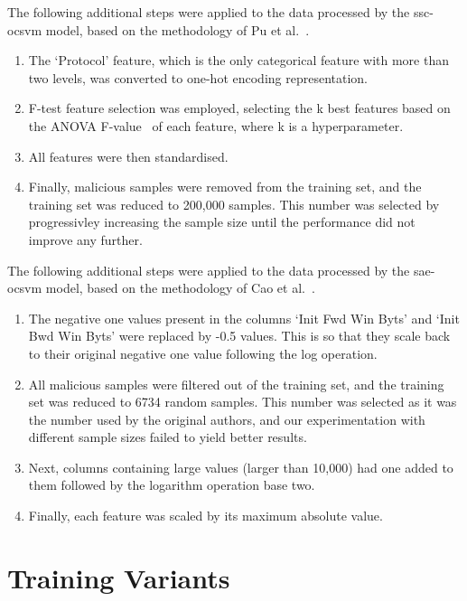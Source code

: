The following additional steps were applied to the data processed by the
\gls{ssc}-\gls{ocsvm} model, based on the methodology of Pu et al.~\cite{Cao}.
\begin{enumerate}
      \item The `Protocol' feature, which is the only categorical feature with more than
            two levels, was converted to one-hot encoding representation.
      \item F-test feature selection was employed, selecting the k best features based on
            the ANOVA F-value~\cite{f_test} of each feature, where k is a hyperparameter.
      \item All features were then standardised.
      \item Finally, malicious samples were removed from the training set, and the training
            set was reduced to 200,000 samples. This number was selected by progressivley
            increasing the sample size until the performance did not improve any further.
\end{enumerate}

The following additional steps were applied to the data processed by the
\gls{sae}-\gls{ocsvm} model, based on the methodology of Cao et al.~\cite{Cao}.
\begin{enumerate}
      \item The negative one values present in the columns `Init Fwd Win Byts' and `Init
            Bwd Win Byts' were replaced by -0.5 values. This is so that they scale back to
            their original negative one value following the log operation.
      \item All malicious samples were filtered out of the training set, and the training
            set was reduced to 6734 random samples. This number was selected as it was the
            number used by the original authors, and our experimentation with different
            sample sizes failed to yield better results.
      \item Next, columns containing large values (larger than 10,000) had one added to
            them followed by the logarithm operation base two.
      \item Finally, each feature was scaled by its maximum absolute value.
\end{enumerate}

\section{Training Variants}%
\label{sec:variants}

